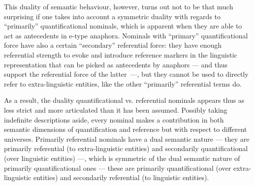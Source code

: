\documentclass[output=paper
	        ,collection
	        ,collectionchapter
 	        ,biblatex
                ,babelshorthands
                ,newtxmath
                ,draftmode
                ,colorlinks, citecolor=brown
]{langscibook}
\begin{document}
This  duality  of  semantic  behaviour,  however,  turns  out  not  to  be  that  much
surprising  if  one  takes into account  a  symmetric  duality  with  regards  to  ``primarily'' quantificational
nominals, which is apparent when they are able to act as antecedents in e-type anaphora. 
Nominals  with  ``primary''  quantificational 
force have also a certain ``secondary'' referential force: they
have enough referential strength to evoke and introduce reference markers in the
linguistic representation that can be picked as antecedents by anaphors --- and
thus support the referential force of the latter~---, but they cannot be used to directly refer 
to extra-linguistic entities, like the other ``primarily'' referential terms do.

As a result, the duality quantificational vs. referential nominals appears thus as less strict and more articulated 
than it has been assumed. Possibly
taking indefinite descriptions aside, every nominal makes a contribution in both semantic  dimensions  
of  quantification  and  reference  but  with  respect  to  different
universes. Primarily referential nominals have a dual semantic nature --- they are
primarily referential (to extra-linguistic entities) and secondarily quantificational 
(over linguistic entities) ---, which is symmetric of
the  dual semantic  nature  of  primarily  quantificational  ones --- these  are  primarily
quantificational (over extra-linguistic entities) and secondarily referential (to linguistic
entities).
\end{document}

